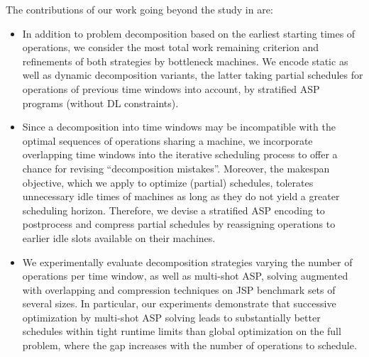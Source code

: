 \documentclass{tlp} %
\begin{document}
The contributions of our work going beyond the study in \citep{elkgeb20a} are:
\begin{itemize}
\item In addition to problem decomposition based on the earliest starting times
      of operations, we consider the most total work remaining criterion and
      refinements of both strategies by bottleneck machines.
      We encode static as well as dynamic decomposition variants, the latter taking
      partial schedules for operations of previous time windows into account, by stratified
      ASP programs (without DL constraints).
\item Since a decomposition into time windows may be incompatible with
      the optimal sequences of operations sharing a machine, we incorporate
      overlapping time windows into the iterative scheduling process to
      offer a chance for revising ``decomposition mistakes''.
      Moreover, the makespan objective, which we apply to optimize (partial) schedules, tolerates unnecessary idle times of machines as long as they do not yield a greater scheduling horizon. 
      Therefore, we devise a stratified ASP encoding to postprocess and compress partial schedules by reassigning operations to earlier idle slots available on their machines.
\item We experimentally evaluate decomposition strategies varying the number of
      operations per time window, as well as multi-shot ASP, solving
      augmented with overlapping and compression techniques
      on JSP benchmark sets of several sizes.
      In particular, our experiments demonstrate that successive optimization
      by multi-shot ASP solving leads to substantially better schedules within
      tight runtime limits than global optimization on the full problem,
      where the gap increases with the number of operations to schedule.
\end{itemize}

\end{document}
